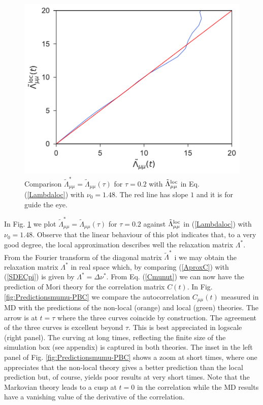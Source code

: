 \documentclass[a4paper,openright,12pt]{book}
\newcommand{\Pendiente}[1]{{\color{green}#1}} %
\begin{document}
\begin{figure}[h!]
  \centering
\includegraphics[scale=0.45]{CompareLambdas-PBC}
\caption[Comparison $\tilde{\Lambda}^*_{\mu\mu}$ and $\tilde{\Lambda}_{\mu\mu}(\tau)$]{Comparison $\tilde{\Lambda}^*_{\mu\mu}=\tilde{\Lambda}_{\mu\mu}(\tau)$ for $\tau=0.2$ with $\tilde{\Lambda}^{\rm loc}_{\mu\mu}$ in Eq. (\ref{Lambdaloc}) with $\nu_0=1.48$. The red line has slope $1$ and it is for guide the eye.}
\label{fig:CompareLambdas-PBC}
\end{figure}
In         Fig.           \ref{fig:CompareLambdas-PBC}         we         plot
$\tilde{\Lambda}^*_{\mu\mu}=\tilde{\Lambda}_{\mu\mu}(\tau)$        for
$\tau=0.2$    against    $\tilde{\Lambda}_{\mu\mu}^{\rm    loc}$    in
(\ref{Lambdaloc})   with  $\nu_0=1.48$. Observe that the linear behaviour of this plot
indicates  that,  to  a  very good  degree,  the  local  approximation
describes well the relaxation matrix $\Lambda^*$.
From the Fourier transform  of the diagonal matrix $\tilde{\Lambda}^*$ i
we may  obtain the relaxation  matrix $\Lambda^*$ in real space which,  by comparing
(\ref{AproxC})      with     (\ref{SDECpi})      is     given      by
$\Lambda^*=\Delta\nu^*$. From Eq.  (\ref{Cmunut}) we can
now  have the  prediction of  Mori theory  for the  correlation matrix
$C(t)$.  In Fig.  \ref{fig:Predictionsmumu-PBC} we compare the autocorrelation
$C_{\mu\mu}(t)$ measured in  MD with the predictions  of the non-local
(orange) and local  (green) theories.  The arrow is at  $t=\tau$ where the
three curves  coincide by  construction.  The  agreement of  the three
curves  is  excellent beyond  $\tau$.   This  is best  appreciated  in
logscale (right panel). The curving at long times,
reflecting the  finite size  of the simulation  box \Pendiente{(see  appendix)} is
captured in  both theories.  The inset  in the left panel of Fig.  \ref{fig:Predictionsmumu-PBC}
shows a zoom at short times,  where one appreciates that the non-local
theory gives  a better  prediction than the  local prediction  but, of
course,  yields  poor results  at  very  short  times. Note  that  the
Markovian theory leads to a cusp at $t=0$ in the correlation while the
MD  results  have   a  vanishing  value  of  the   derivative  of  the
correlation.
\end{document}
